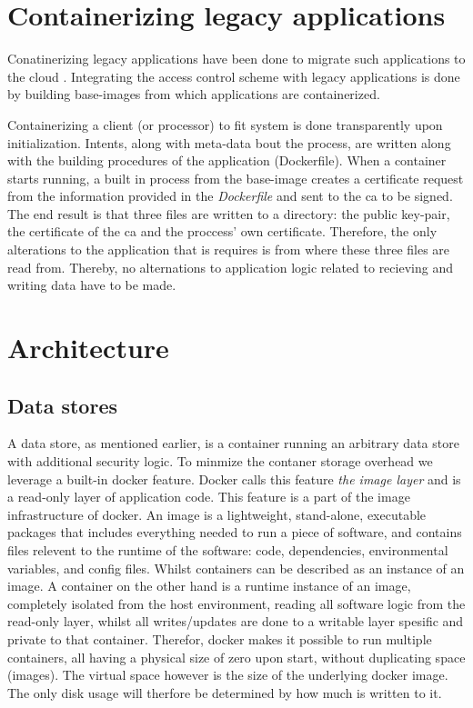 \documentclass[USenglish]{uit-thesis}
\begin{document}
\section{Containerizing legacy applications}
Conatinerizing legacy applications have been done to migrate
such applications to the cloud \cite{7092950}.
Integrating the access control scheme with legacy applications is done by
building base-images from which applications are containerized.

Containerizing a client (or processor) to fit system is done transparently upon
initialization.
Intents, along with meta-data bout the process, are written along with the building procedures
of the application (Dockerfile).
When a container starts running, a built in process from the base-image creates a certificate request
from the information provided in the \textit{Dockerfile} and sent to the \gls{ca} to be signed.
The end result is that three files are written to a directory: the public key-pair,
the certificate of the \gls{ca} and the proccess' own certificate.
Therefore, the only alterations to the application that is requires is from where
these three files are read from.
Thereby, no alternations to application logic related to recieving and writing data have
to be made.

\section{Architecture}

\subsection{Data stores}
A data store, as mentioned earlier, is a container running an arbitrary data store
with additional security logic.
To minmize the contaner storage overhead we leverage a built-in docker feature.
Docker calls this feature \textit{the image layer} and is a read-only layer of application code.
This feature is a part of the image infrastructure of docker.
An image is a lightweight, stand-alone, executable packages that includes everything
needed to run a piece of software, and contains files relevent to the runtime of the software:
code, dependencies, environmental variables, and config files.
Whilst containers can be described as an instance of an image.
A container on the other hand is a runtime instance of an image, completely isolated from the host environment, reading all software logic from the read-only layer,
whilst all writes/updates are done to a writable layer spesific and private to that container.
Therefor, docker makes it possible to run multiple containers, all having a physical size of zero upon start,
without duplicating space (images).
The virtual space however is the size of the underlying docker image.
The only disk usage will therfore be determined by how much is written to it.
\end{document}
